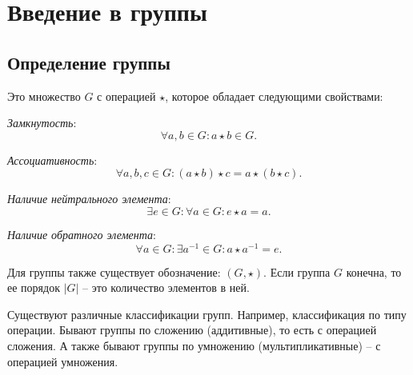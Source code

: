 \section{Введение в группы}

\subsection{Определение группы}
\begin{definition}
    [Группа]
    Это множество $G$ с операцией $\star$, которое обладает следующими свойствами: 
    \begin{conditions}
        \item \textit{Замкнутость}: $$\forall a, b \in G: a \star b \in G.$$
        \item \textit{Ассоциативность}: $$\forall a, b, c \in G: (a \star b) \star c = a \star (b \star c).$$
        \item \textit{Наличие нейтрального элемента}: $$\exists e \in G: \forall a \in G: e \star a = a.$$
        \item \textit{Наличие обратного элемента}: $$\forall a \in G: \exists a^{-1} \in G: a \star a^{-1} = e.$$
    \end{conditions}
    Для группы также существует обозначение: $(G, \star).$
    Если группа $G$ конечна, то ее порядок $|G|$ -- это количество элементов в ней.
\end{definition}

Существуют различные классификации групп. Например, классификация по типу операции. 
Бывают группы по сложению (аддитивные), то есть с операцией сложения. 
А также бывают группы по умножению (мультипликативные) -- с операцией умножения.


